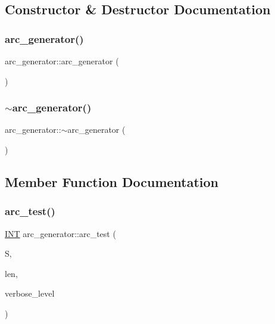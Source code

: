 \subsection{Constructor \& Destructor Documentation}
\mbox{\label{classarc__generator_a3dddba31da36ee407ac37cf3329375b1}} 
\subsubsection{\texorpdfstring{arc\+\_\+generator()}{arc\_generator()}}
{\footnotesize\ttfamily arc\+\_\+generator\+::arc\+\_\+generator (\begin{DoxyParamCaption}{ }\end{DoxyParamCaption})}

\mbox{\label{classarc__generator_a4e807cda927463cb8dd096ffaa7bc307}} 
\subsubsection{\texorpdfstring{$\sim$arc\+\_\+generator()}{~arc\_generator()}}
{\footnotesize\ttfamily arc\+\_\+generator\+::$\sim$arc\+\_\+generator (\begin{DoxyParamCaption}{ }\end{DoxyParamCaption})}



\subsection{Member Function Documentation}
\mbox{\label{classarc__generator_ae3ad9ae489d2c04ecb3664fe217d1e54}} 
\subsubsection{\texorpdfstring{arc\+\_\+test()}{arc\_test()}}
{\footnotesize\ttfamily \mbox{\hyperlink{galois_8h_a09fddde158a3a20bd2dcadb609de11dc}{I\+NT}} arc\+\_\+generator\+::arc\+\_\+test (\begin{DoxyParamCaption}\item[{\mbox{\hyperlink{galois_8h_a09fddde158a3a20bd2dcadb609de11dc}{I\+NT}} $\ast$}]{S,  }\item[{\mbox{\hyperlink{galois_8h_a09fddde158a3a20bd2dcadb609de11dc}{I\+NT}}}]{len,  }\item[{\mbox{\hyperlink{galois_8h_a09fddde158a3a20bd2dcadb609de11dc}{I\+NT}}}]{verbose\+\_\+level }\end{DoxyParamCaption})}

